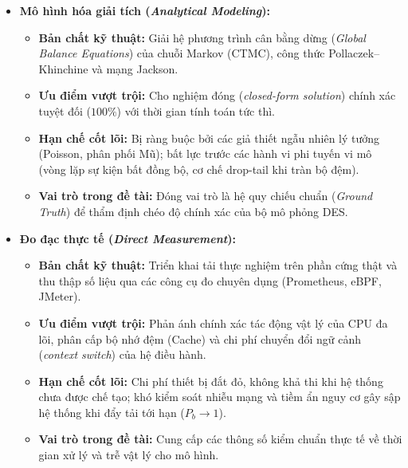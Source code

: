 \begin{itemize}[leftmargin=1.5em, itemsep=6pt]
    \item \textbf{Mô hình hóa giải tích (\textit{Analytical Modeling}):}
    \begin{itemize}[leftmargin=1.2em, itemsep=2pt, topsep=2pt]
        \item \textbf{Bản chất kỹ thuật:} Giải hệ phương trình cân bằng dừng (\textit{Global Balance Equations}) của chuỗi Markov (CTMC), công thức Pollaczek--Khinchine và mạng Jackson.
        \item \textbf{Ưu điểm vượt trội:} Cho nghiệm đóng (\textit{closed-form solution}) chính xác tuyệt đối ($100\%$) với thời gian tính toán tức thì.
        \item \textbf{Hạn chế cốt lõi:} Bị ràng buộc bởi các giả thiết ngẫu nhiên lý tưởng (Poisson, phân phối Mũ); bất lực trước các hành vi phi tuyến vi mô (vòng lặp sự kiện bất đồng bộ, cơ chế drop-tail khi tràn bộ đệm).
        \item \textbf{Vai trò trong đề tài:} Đóng vai trò là hệ quy chiếu chuẩn (\textit{Ground Truth}) để thẩm định chéo độ chính xác của bộ mô phỏng DES.
    \end{itemize}

    \item \textbf{Đo đạc thực tế (\textit{Direct Measurement}):}
    \begin{itemize}[leftmargin=1.2em, itemsep=2pt, topsep=2pt]
        \item \textbf{Bản chất kỹ thuật:} Triển khai tải thực nghiệm trên phần cứng thật và thu thập số liệu qua các công cụ đo chuyên dụng (Prometheus, eBPF, JMeter).
        \item \textbf{Ưu điểm vượt trội:} Phản ánh chính xác tác động vật lý của CPU đa lõi, phân cấp bộ nhớ đệm (Cache) và chi phí chuyển đổi ngữ cảnh (\textit{context switch}) của hệ điều hành.
        \item \textbf{Hạn chế cốt lõi:} Chi phí thiết bị đắt đỏ, không khả thi khi hệ thống chưa được chế tạo; khó kiểm soát nhiễu mạng và tiềm ẩn nguy cơ gây sập hệ thống khi đẩy tải tới hạn ($P_b \to 1$).
        \item \textbf{Vai trò trong đề tài:} Cung cấp các thông số kiểm chuẩn thực tế về thời gian xử lý và trễ vật lý cho mô hình.
    \end{itemize}


\end{itemize}
